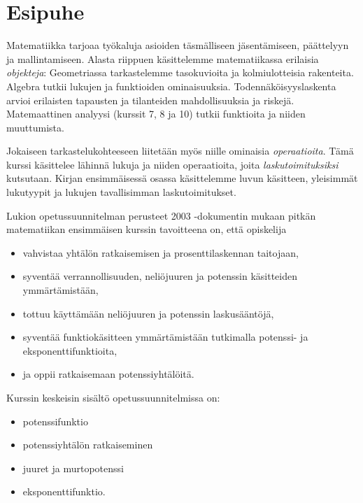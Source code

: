 
\chapter{Esipuhe}



Matematiikka tarjoaa työkaluja asioiden täsmälliseen jäsentämiseen, päättelyyn ja mallintamiseen. Alasta riippuen käsittelemme matematiikassa erilaisia \emph{objekteja}: Geometriassa tarkastelemme tasokuvioita ja kolmiulotteisia rakenteita. Algebra tutkii lukujen ja funktioiden ominaisuuksia. Todennäköisyyslaskenta arvioi erilaisten tapausten ja tilanteiden mahdollisuuksia ja riskejä. Matemaattinen analyysi (kurssit 7, 8 ja 10) tutkii funktioita ja niiden muuttumista.

Jokaiseen tarkastelukohteeseen liitetään myös niille ominaisia \emph{operaatioita}. Tämä kurssi käsittelee lähinnä lukuja ja niiden operaatioita, joita \emph{laskutoimituksiksi} kutsutaan. Kirjan ensimmäisessä osassa käsittelemme luvun käsitteen, yleisimmät lukutyypit ja lukujen tavallisimman laskutoimitukset.

Lukion opetussuunnitelman perusteet 2003 -dokumentin mukaan pitkän matematiikan ensimmäisen kurssin tavoitteena on, että opiskelija 
\begin{itemize}
\item vahvistaa yhtälön ratkaisemisen ja prosenttilaskennan taitojaan,
\item syventää verrannollisuuden, neliöjuuren ja potenssin käsitteiden ymmärtämistään,
\item tottuu käyttämään neliöjuuren ja potenssin laskusääntöjä,
\item syventää funktiokäsitteen ymmärtämistään tutkimalla potenssi- ja eksponenttifunktioita,
\item ja oppii ratkaisemaan potenssiyhtälöitä.
\end{itemize}
Kurssin keskeisin sisältö opetussuunnitelmissa on:
\begin{itemize}
\item potenssifunktio
\item potenssiyhtälön ratkaiseminen
\item juuret ja murtopotenssi
\item eksponenttifunktio.
\end{itemize}

